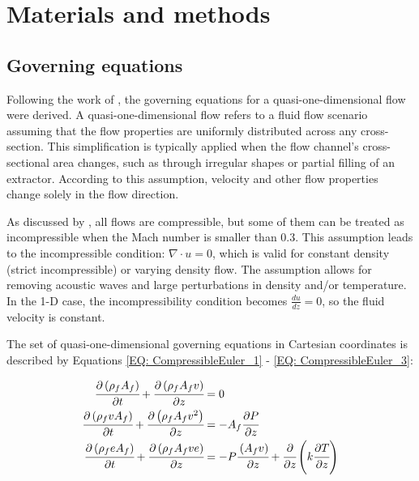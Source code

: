 \documentclass[../Article_Model_Parameters.tex]{subfiles}
\begin{document}
	
	\section{Materials and methods} \label{CH: Materials and methods}
	
	\subsection{Governing equations} \label{CH:Governing_equations_chapter}
	Following the work of \citet{Anderson1995}, the governing equations for a quasi-one-dimensional flow were derived. A quasi-one-dimensional flow refers to a fluid flow scenario assuming that the flow properties are uniformly distributed across any cross-section. This simplification is typically applied when the flow channel's cross-sectional area changes, such as through irregular shapes or partial filling of an extractor. According to this assumption, velocity and other flow properties change solely in the flow direction.
	
	As discussed by \citet{Anderson2023}, all flows are compressible, but some of them can be treated as incompressible when the Mach number is smaller than 0.3. This assumption leads to the incompressible condition: $\nabla \cdot u =0$, which is valid for constant density (strict incompressible) or varying density flow. The assumption allows for removing acoustic waves and large perturbations in density and/or temperature. In the 1-D case, the incompressibility condition becomes $\frac{du}{dz} = 0$, so the fluid velocity is constant.
	
	The set of quasi-one-dimensional governing equations in Cartesian coordinates is described by Equations \ref{EQ: CompressibleEuler_1} - \ref{EQ: CompressibleEuler_3}:
	
	{\footnotesize
		\begin{align}
			\label{EQ: CompressibleEuler_1}
			\cfrac{\partial \left( \rho_f A_f \right) }{\partial t} + \cfrac{\partial \left( \rho_f A_f v \right)}{\partial z} &= 0 \\
			\cfrac{\partial \left( \rho_f v A_f \right) }{\partial t} + \cfrac{\partial \left( \rho_f A_f v^2 \right)}{\partial z} &= -A_f \cfrac{\partial P}{\partial z} \label{EQ: CompressibleEuler_2} \\
			\cfrac{\partial \left( \rho_f e A_f \right) }{\partial t} + \cfrac{\partial \left( \rho_f A_f v e\right)}{\partial z} &= -P\cfrac{\left( A_f v \right)}{\partial z} + \cfrac{\partial}{\partial z} \left( k \cfrac{\partial T}{\partial z} \right)   
			\label{EQ: CompressibleEuler_3}
		\end{align}  
	}
	
\end{document}
